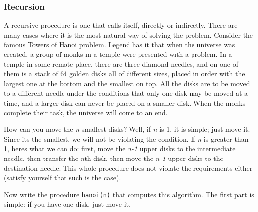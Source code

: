
\subsubsection[Recursion]{Recursion}

A recursive procedure is one that calls itself,
directly or indirectly. There are many cases where it is the most
natural way of solving the problem. Consider the famous
{\textquotedbl}Towers of Hanoi{\textquotedbl} problem.
Legend has it that when the universe was created, a group of monks in a
temple were presented with a problem. In a temple in some remote place,
there are three diamond needles, and on one of them is a
stack of 64 golden disks all of different sizes, placed in
order with the largest one at the bottom and the smallest on top. All
the disks are to be moved to a different needle under the conditions
that only one disk may be moved at a time, and a larger disk can never
be placed on a smaller disk. When the monks complete their task, the
universe will come to an end.

How can you move the \textit{n} smallest disks? Well, if \textit{n} is
1, it is simple; just move it. Since it{\textquotesingle}s the
smallest, we will not be violating the condition. If \textit{n} is
greater than 1, here{\textquotesingle}s what we can do: first, move the
\textit{n-1} upper disks to the intermediate needle, then transfer the
\textit{n}th disk, then move the \textit{n-1} upper disks to the
destination needle. This whole procedure does not violate the
requirements either (satisfy yourself that such is the case).

Now write the procedure \texttt{hanoi(n)} that computes this algorithm.
The first part is simple: if you have one disk, just move it.


